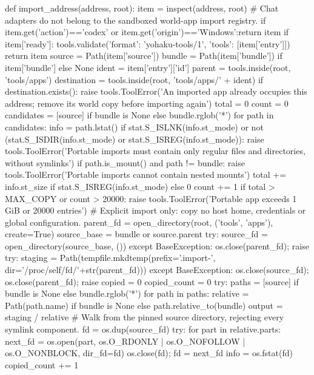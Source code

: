 def import_address(address, root):
    item = inspect(address, root)
    # Chat adapters do not belong to the sandboxed world-app import registry.
    if item.get('action')=='codex' or item.get('origin')=='Windows':return item
    if item['ready']:
        tools.validate({'format': 'yohaku-tools/1', 'tools': [item['entry']]})
        return item
    source = Path(item['source'])
    bundle = Path(item['bundle']) if item['bundle'] else None
    ident = item['entry']['id']
    parent = tools.inside(root, 'tools/apps')
    destination = tools.inside(root, 'tools/apps/' + ident)
    if destination.exists():
        raise tools.ToolError('An imported app already occupies this address; remove its world copy before importing again')
    total = 0
    count = 0
    candidates = [source] if bundle is None else bundle.rglob('*')
    for path in candidates:
        info = path.lstat()
        if stat.S_ISLNK(info.st_mode) or not (stat.S_ISDIR(info.st_mode) or stat.S_ISREG(info.st_mode)):
            raise tools.ToolError('Portable imports must contain only regular files and directories, without symlinks')
        if path.is_mount() and path != bundle:
            raise tools.ToolError('Portable imports cannot contain nested mounts')
        total += info.st_size if stat.S_ISREG(info.st_mode) else 0
        count += 1
        if total > MAX_COPY or count > 20000:
            raise tools.ToolError('Portable app exceeds 1 GiB or 20000 entries')
    # Explicit import only: copy no host home, credentials or global configuration.
    parent_fd = open_directory(root, ('tools', 'apps'), create=True)
    source_base = bundle or source.parent
    try:
        source_fd = open_directory(source_base, ())
    except BaseException:
        os.close(parent_fd); raise
    try:
        staging = Path(tempfile.mkdtemp(prefix='.import-', dir='/proc/self/fd/'+str(parent_fd)))
    except BaseException:
        os.close(source_fd); os.close(parent_fd); raise
    copied = 0
    copied_count = 0
    try:
        paths = [source] if bundle is None else bundle.rglob('*')
        for path in paths:
            relative = Path(path.name) if bundle is None else path.relative_to(bundle)
            output = staging / relative
            # Walk from the pinned source directory, rejecting every symlink component.
            fd = os.dup(source_fd)
            try:
                for part in relative.parts:
                    next_fd = os.open(part, os.O_RDONLY | os.O_NOFOLLOW | os.O_NONBLOCK, dir_fd=fd)
                    os.close(fd); fd = next_fd
                info = os.fstat(fd)
                copied_count += 1

